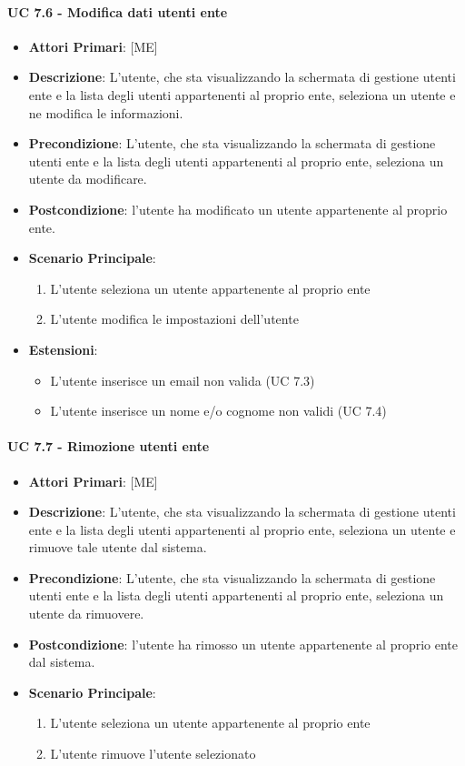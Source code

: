 			\paragraph{UC 7.6 - Modifica dati utenti ente}
			\begin{itemize}
				\item \textbf{Attori Primari}: [ME]
				\item \textbf{Descrizione}: L'utente,  che sta visualizzando la schermata di gestione utenti ente e la lista degli utenti appartenenti al proprio ente, seleziona un utente e ne modifica le informazioni.
				\item \textbf{Precondizione}: L'utente, che sta visualizzando la schermata di gestione utenti ente e la lista degli utenti appartenenti al proprio ente, seleziona un utente da modificare.
				\item \textbf{Postcondizione}: l'utente ha modificato un utente appartenente al proprio ente.
				\item \textbf{Scenario Principale}:
				\begin{enumerate}
					\item{L'utente seleziona un utente appartenente al proprio ente}
					\item{L'utente modifica le impostazioni dell'utente}
				\end{enumerate}	
				\item \textbf{Estensioni}:
				\begin{itemize}
					\item L'utente inserisce un email non valida (UC 7.3)
					\item L'utente inserisce un nome e/o cognome non validi (UC 7.4)
				\end{itemize}
			\end{itemize}
			
			\paragraph{UC 7.7 - Rimozione utenti ente}
			\begin{itemize}
				\item \textbf{Attori Primari}: [ME]
				\item \textbf{Descrizione}: L'utente,  che sta visualizzando la schermata di gestione utenti ente e la lista degli utenti appartenenti al proprio ente, seleziona un utente e rimuove tale utente dal sistema.
				\item \textbf{Precondizione}: L'utente, che sta visualizzando la schermata di gestione utenti ente e la lista degli utenti appartenenti al proprio ente, seleziona un utente da rimuovere.
				\item \textbf{Postcondizione}: l'utente ha rimosso un utente appartenente al proprio ente dal sistema.
				\item \textbf{Scenario Principale}:
				\begin{enumerate}
					\item{L'utente seleziona un utente appartenente al proprio ente}
					\item{L'utente rimuove l'utente selezionato}
				\end{enumerate}		
			\end{itemize}

